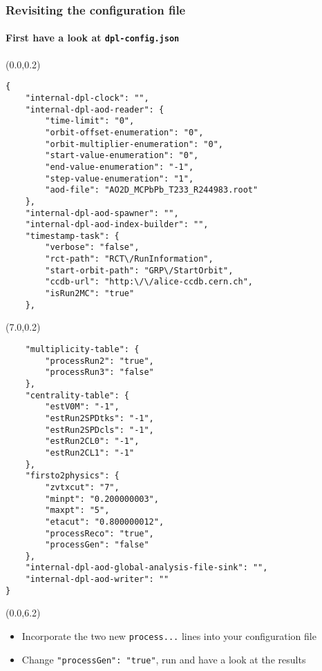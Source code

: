 \documentclass[14pt,aspectratio=169,t]{beamer}
\begin{document}
\begin{frame}[fragile]
  \frametitle{Revisiting the configuration file}
  \framesubtitle{First have a look at \texttt{dpl-config.json}}
  \begin{textblock}{6}(0.0,0.2)
    {\tiny\color{blue}
    \vspace{-0.0in}
    \begin{verbatim}
{
    "internal-dpl-clock": "",
    "internal-dpl-aod-reader": {
        "time-limit": "0",
        "orbit-offset-enumeration": "0",
        "orbit-multiplier-enumeration": "0",
        "start-value-enumeration": "0",
        "end-value-enumeration": "-1",
        "step-value-enumeration": "1",
        "aod-file": "AO2D_MCPbPb_T233_R244983.root"
    },
    "internal-dpl-aod-spawner": "",
    "internal-dpl-aod-index-builder": "",
    "timestamp-task": {
        "verbose": "false",
        "rct-path": "RCT\/RunInformation",
        "start-orbit-path": "GRP\/StartOrbit",
        "ccdb-url": "http:\/\/alice-ccdb.cern.ch",
        "isRun2MC": "true"
    },
    \end{verbatim}}
  \end{textblock}
  \begin{textblock}{6}(7.0,0.2)
    {\tiny\color{blue}
    \vspace{-0.0in}
    \begin{verbatim}
    "multiplicity-table": {
        "processRun2": "true",
        "processRun3": "false"
    },
    "centrality-table": {
        "estV0M": "-1",
        "estRun2SPDtks": "-1",
        "estRun2SPDcls": "-1",
        "estRun2CL0": "-1",
        "estRun2CL1": "-1"
    },
    "firsto2physics": {
        "zvtxcut": "7",
        "minpt": "0.200000003",
        "maxpt": "5",
        "etacut": "0.800000012",
        "processReco": "true",
        "processGen": "false"
    },
    "internal-dpl-aod-global-analysis-file-sink": "",
    "internal-dpl-aod-writer": ""
}
    \end{verbatim}}
  \end{textblock}
  \begin{textblock}{14}(0.0,6.2)
    \begin{itemize}
      \small
      \item Incorporate the two new {\color{blue}\texttt{process...}} lines into your configuration file
      \item Change {\color{blue} \verb|"processGen": "true"|}, run and have a look at the results
    \end{itemize}

  \end{textblock}
\end{frame}
\end{document}
